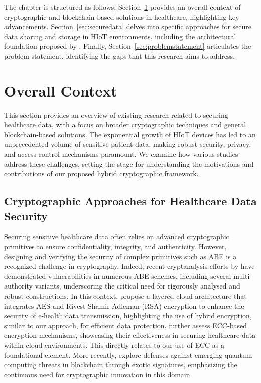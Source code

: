 \documentclass[cic,tc,english]{iiufrgs}
\numberwithin{algorithm}{chapter}
\begin{document}
    The chapter is structured as follows: Section~\ref{sec:overallcontext} provides an overall context of cryptographic and blockchain-based solutions in healthcare, highlighting key advancements. Section~\ref{sec:securedata} delves into specific approaches for secure data sharing and storage in HIoT environments, including the architectural foundation proposed by \citet{laura2023}. Finally, Section~\ref{sec:problemstatement} articulates the problem statement, identifying the gaps that this research aims to address.

    \section{Overall Context}
    \label{sec:overallcontext}

        This section provides an overview of existing research related to securing healthcare data, with a focus on broader cryptographic techniques and general blockchain-based solutions. The exponential growth of HIoT devices has led to an unprecedented volume of sensitive patient data, making robust security, privacy, and access control mechanisms paramount. We examine how various studies address these challenges, setting the stage for understanding the motivations and contributions of our proposed hybrid cryptographic framework.

        \subsection{Cryptographic Approaches for Healthcare Data Security}
            Securing sensitive healthcare data often relies on advanced cryptographic primitives to ensure confidentiality, integrity, and authenticity. However, designing and verifying the security of complex primitives such as ABE is a recognized challenge in cryptography. Indeed, recent cryptanalysis efforts by \citet{broken2020} have demonstrated vulnerabilities in numerous ABE schemes, including several multi-authority variants, underscoring the critical need for rigorously analysed and robust constructions. In this context, \citet{Memos2021} propose a layered cloud architecture that integrates AES and Rivest-Shamir-Adleman (RSA) encryption to enhance the security of e-health data transmission, highlighting the use of hybrid encryption, similar to our approach, for efficient data protection. \citet{Hema2019} further assess ECC-based encryption mechanisms, showcasing their effectiveness in securing healthcare data within cloud environments. This directly relates to our use of ECC as a foundational element. More recently, \citet{Naz2024} explore defenses against emerging quantum computing threats in blockchain through exotic signatures, emphasizing the continuous need for cryptographic innovation in this domain.
\end{document}
